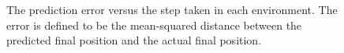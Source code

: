 \documentclass[journal]{IEEEtran}
\begin{document}
\begin{figure}[!t]
\centering
{}
{}
\vfil
{}
{}
\caption{The prediction error versus the step taken in each environment.
The error is defined to be the mean-squared distance between the predicted final position and the actual final position.
}
\label{dynamics_learning}
\end{figure}
\end{document}

